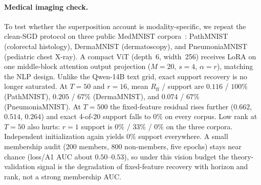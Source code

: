 
\paragraph{Medical imaging check.}
To test whether the superposition account is modality-specific, we repeat the clean-SGD protocol on three public MedMNIST corpora~\citep{yang2023medmnist}: PathMNIST (colorectal histology), DermaMNIST (dermatoscopy), and PneumoniaMNIST (pediatric chest X-ray).
A compact ViT (depth~6, width~256) receives LoRA on one middle-block attention output projection ($M{=}20$, $s{=}4$, $\alpha{=}r$), matching the NLP design.
Unlike the Qwen-14B text grid, exact support recovery is no longer saturated.
At $T{=}50$ and $r{=}16$, mean $R_{\mathrm{ff}}$ / support are $0.116$ / $100\%$ (PathMNIST), $0.205$ / $67\%$ (DermaMNIST), and $0.074$ / $67\%$ (PneumoniaMNIST).
At $T{=}500$ the fixed-feature residual rises further ($0.662$, $0.514$, $0.264$) and exact 4-of-20 support falls to $0\%$ on every corpus.
Low rank at $T{=}50$ also hurts: $r{=}1$ support is $0\%$ / $33\%$ / $0\%$ on the three corpora.
Independent initialization again yields $0\%$ support everywhere.
A small membership audit (200 members, 800 non-members, five epochs) stays near chance (loss/A1 AUC about $0.50$--$0.53$), so under this vision budget the theory-validation signal is the degradation of fixed-feature recovery with horizon and rank, not a strong membership AUC.
